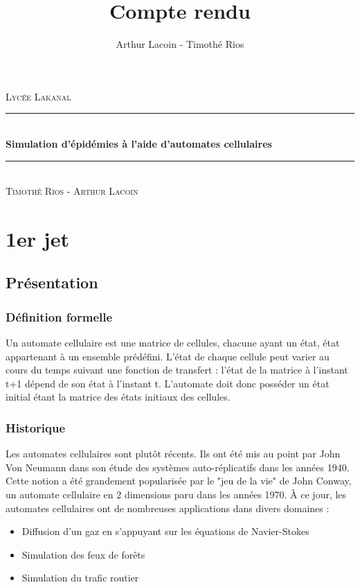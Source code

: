 \documentclass{article}
\title{Compte rendu}
\author{Arthur Lacoin - Timothé Rios}
\date{}
\newcommand{\HRule}{\rule{\linewidth}{0.5mm}}
\begin{document}
\begin{titlepage}
    \begin{sffamily}
    \begin{center}

        \textsc{\LARGE Lycée Lakanal}~\\[2cm]

        \HRule \\[0.4cm]
        { \huge \bfseries Simulation d'épidémies à l'aide d'automates cellulaires\\[0.4cm] }
    
        \HRule \\[2cm]
        \textsc{\Large Timothé Rios - Arthur Lacoin}\\[2cm]

    \end{center}
\end{sffamily}
\end{titlepage}

\begin{abstract}



\end{abstract}

\section{1er jet}

\subsection{Présentation}

\subsubsection{Définition formelle}
	Un automate cellulaire est une matrice de cellules, chacune ayant un état, état appartenant à un ensemble prédéfini. L'état de chaque cellule peut varier au cours du temps suivant une fonction de transfert : l'état de la matrice à l'instant t+1 dépend de son état à l'instant t. L'automate doit donc posséder un état initial étant la matrice des états initiaux des cellules.

\subsubsection{Historique}
	Les automates cellulaires sont plutôt récents. Ils ont été mis au point par John Von Neumann dans son étude des systèmes auto-réplicatifs dans les années 1940. Cette notion a été grandement popularisée par le "jeu de la vie" de John Conway, un automate cellulaire en 2 dimensions paru dans les années 1970. À ce jour, les automates cellulaires ont de nombreuses applications dans divers domaines :
	\begin{itemize}
	\item Diffusion d'un gaz en s'appuyant sur les équations de Navier-Stokes
	\item Simulation des feux de forêts
	\item Simulation du trafic routier
	\end{itemize}
\end{document}
